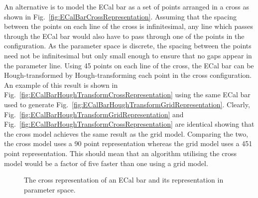 An alternative is to model the ECal bar as a set of points arranged in a cross as shown in Fig.~\ref{fig:ECalBarCrossRepresentation}.  Assuming that the spacing between the points on each line of the cross is infinitesimal, any line which passes through the ECal bar would also have to pass through one of the points in the configuration.  As the parameter space is discrete, the spacing between the points need not be infinitesimal but only small enough to ensure that no gaps appear in the parameter line.  Using 45 points on each line of the cross, the ECal bar can be Hough-transformed by Hough-transforming each point in the cross configuration. An example of this result is shown in Fig.~\ref{fig:ECalBarHoughTransformCrossRepresentation} using the same ECal bar used to generate Fig.~\ref{fig:ECalBarHoughTransformGridRepresentation}.  Clearly, Fig.~\ref{fig:ECalBarHoughTransformGridRepresentation} and Fig.~\ref{fig:ECalBarHoughTransformCrossRepresentation} are identical showing that the cross model achieves the same result as the grid model.  Comparing the two, the cross model uses a 90 point representation whereas the grid model uses a 451 point representation.  This should mean that an algorithm utilising the cross model would be a factor of five faster than one using a grid model.
\begin{figure}%
  \centering
  \caption{The cross representation of an ECal bar and its representation in parameter space.}
  \label{fig:ECalBarCrossRepresentationAndHoughTransform}
\end{figure}


